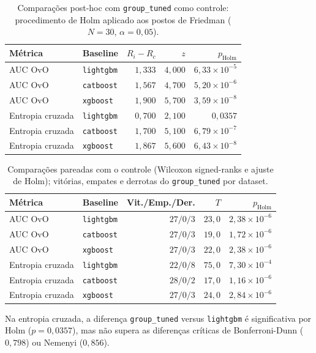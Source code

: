 \documentclass[11pt,a4paper]{article}
\begin{document}
\begin{table}[htbp]
    \centering
    \caption{Comparações post-hoc com \texttt{group\_tuned} como controle: procedimento de Holm aplicado aos postos de Friedman ($N=30$, $\alpha=0{,}05$).}
    \label{tab:holm_wilcoxon}
    \small
    \begin{tabular}{@{}llrrr@{}}
        \toprule
        \textbf{Métrica} & \textbf{Baseline} & $R_i-R_c$ & $z$ & $p_{\mathrm{Holm}}$ \\
        \midrule
        AUC OvO & \texttt{lightgbm} & $1{,}333$ & $4{,}000$ & $6{,}33\times10^{-5}$ \\
        AUC OvO & \texttt{catboost} & $1{,}567$ & $4{,}700$ & $5{,}20\times10^{-6}$ \\
        AUC OvO & \texttt{xgboost} & $1{,}900$ & $5{,}700$ & $3{,}59\times10^{-8}$ \\
        \midrule
        Entropia cruzada & \texttt{lightgbm} & $0{,}700$ & $2{,}100$ & $0{,}0357$ \\
        Entropia cruzada & \texttt{catboost} & $1{,}700$ & $5{,}100$ & $6{,}79\times10^{-7}$ \\
        Entropia cruzada & \texttt{xgboost} & $1{,}867$ & $5{,}600$ & $6{,}43\times10^{-8}$ \\
        \bottomrule
    \end{tabular}
\end{table}

\begin{table}[htbp]
    \centering
    \caption{Comparações pareadas com o controle (Wilcoxon signed-ranks e ajuste de Holm); vitórias, empates e derrotas do \texttt{group\_tuned} por dataset.}
    \label{tab:wilcoxon_baselines}
    \small
    \begin{tabular}{@{}llrrr@{}}
        \toprule
        \textbf{Métrica} & \textbf{Baseline} & \textbf{Vit./Emp./Der.} & $T$ & $p_{\mathrm{Holm}}$ \\
        \midrule
        AUC OvO & \texttt{lightgbm} & $27/0/3$ & $23{,}0$ & $2{,}38\times10^{-6}$ \\
        AUC OvO & \texttt{catboost} & $27/0/3$ & $19{,}0$ & $1{,}72\times10^{-6}$ \\
        AUC OvO & \texttt{xgboost} & $27/0/3$ & $22{,}0$ & $2{,}38\times10^{-6}$ \\
        \midrule
        Entropia cruzada & \texttt{lightgbm} & $22/0/8$ & $75{,}0$ & $7{,}30\times10^{-4}$ \\
        Entropia cruzada & \texttt{catboost} & $28/0/2$ & $17{,}0$ & $1{,}16\times10^{-6}$ \\
        Entropia cruzada & \texttt{xgboost} & $27/0/3$ & $24{,}0$ & $2{,}84\times10^{-6}$ \\
        \bottomrule
    \end{tabular}
    \par\vspace{0.4em}
    {\footnotesize Na entropia cruzada, a diferença \texttt{group\_tuned} versus \texttt{lightgbm} é significativa por Holm ($p=0{,}0357$), mas não supera as diferenças críticas de Bonferroni-Dunn ($0{,}798$) ou Nemenyi ($0{,}856$).}
\end{table}
\end{document}
